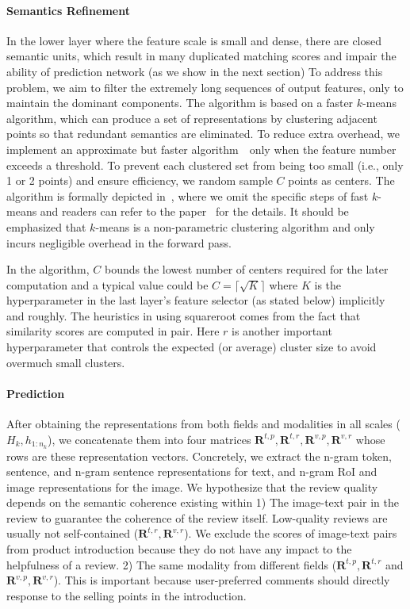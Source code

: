 \paragraph{Semantics Refinement}
In the lower layer where the feature scale is small and dense, there are closed semantic units, which result in many duplicated matching scores and impair the ability of prediction network (as we show in the next section)
To address this problem, we aim to filter the extremely long sequences of output features, only to maintain the dominant components.
The algorithm is based on a faster $k$-means algorithm, which can produce a set of representations by clustering adjacent points so that redundant semantics are eliminated.
To reduce extra overhead, we implement an approximate but faster algorithm~\cite{hamerly2010making}~only when the feature number exceeds a threshold.
To prevent each clustered set from being too small (i.e., only 1 or 2 points) and ensure efficiency, we random sample $C$ points as centers.
The algorithm is formally depicted in~, where we omit the specific steps of fast $k$-means and readers can refer to the paper~\cite{hamerly2010making} for the details. It should be emphasized that $k$-means is a non-parametric clustering algorithm and only incurs negligible overhead in the forward pass.


In the algorithm, $C$ bounds the lowest number of centers required for the later computation and a typical value could be $C=\lceil \sqrt{K} \rceil$ where $K$ is the hyperparameter in the last layer's feature selector (as stated below) implicitly and roughly. The heuristics in using squareroot comes from the fact that similarity scores are computed in pair. 
Here $r$ is another important hyperparameter that controls the expected (or average) cluster size to avoid overmuch small clusters.

\paragraph{Prediction} After obtaining the representations from both fields and modalities in all scales ($H_k, h_{1:n_k}$), we concatenate them into four matrices $\mathbf{R}^{t,p},\mathbf{R}^{t,r},\mathbf{R}^{v,p},\mathbf{R}^{v, r}$ whose rows are these representation vectors.
Concretely, we extract the n-gram token, sentence, and n-gram sentence representations for text, and n-gram RoI and image representations for the image.
We hypothesize that the review quality depends on the semantic coherence existing within 
1) The image-text pair in the review to guarantee the coherence of the review itself. Low-quality reviews are usually not self-contained ($\mathbf{R}^{t,r},\mathbf{R}^{v,r}$). 
We exclude the scores of image-text pairs from product introduction because they do not have any impact to the helpfulness of a review.
2) The same modality from different fields ($\mathbf{R}^{t,p},\mathbf{R}^{t,r}$ and $\mathbf{R}^{v,p},\mathbf{R}^{v,r}$). This is important because user-preferred comments should directly response to the selling points in the introduction.

